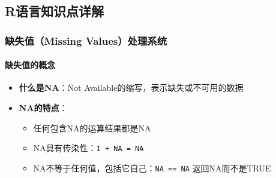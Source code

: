 \documentclass[
]{book}
\newenvironment{Shaded}{\begin{snugshade}}{\end{snugshade}}
\newcommand{\CommentTok}[1]{\textcolor[rgb]{0.56,0.35,0.01}{\textit{#1}}}
\newcommand{\ConstantTok}[1]{\textcolor[rgb]{0.56,0.35,0.01}{#1}}
\newcommand{\DecValTok}[1]{\textcolor[rgb]{0.00,0.00,0.81}{#1}}
\newcommand{\FunctionTok}[1]{\textcolor[rgb]{0.13,0.29,0.53}{\textbf{#1}}}
\newcommand{\NormalTok}[1]{#1}
\newcommand{\OtherTok}[1]{\textcolor[rgb]{0.56,0.35,0.01}{#1}}
\newcommand{\SpecialCharTok}[1]{\textcolor[rgb]{0.81,0.36,0.00}{\textbf{#1}}}
\providecommand{\tightlist}{%
  \setlength{\itemsep}{0pt}\setlength{\parskip}{0pt}}
\begin{document}
\begin{Shaded}
\end{Shaded}

\hypertarget{rux8bedux8a00ux77e5ux8bc6ux70b9ux8be6ux89e3-5}{%
\subsection{R语言知识点详解}\label{rux8bedux8a00ux77e5ux8bc6ux70b9ux8be6ux89e3-5}}

\hypertarget{ux7f3aux5931ux503cmissing-valuesux5904ux7406ux7cfbux7edf}{%
\subsubsection{缺失值（Missing Values）处理系统}\label{ux7f3aux5931ux503cmissing-valuesux5904ux7406ux7cfbux7edf}}

\hypertarget{ux7f3aux5931ux503cux7684ux6982ux5ff5}{%
\paragraph{缺失值的概念}\label{ux7f3aux5931ux503cux7684ux6982ux5ff5}}

\begin{itemize}
\tightlist
\item
  \textbf{什么是NA}：Not Available的缩写，表示缺失或不可用的数据
\item
  \textbf{NA的特点}：

  \begin{itemize}
  \tightlist
  \item
    任何包含NA的运算结果都是NA
  \item
    NA具有传染性：\texttt{1\ +\ NA\ =\ NA}
  \item
    NA不等于任何值，包括它自己：\texttt{NA\ ==\ NA} 返回NA而不是TRUE
  \end{itemize}
\end{itemize}
\end{document}
